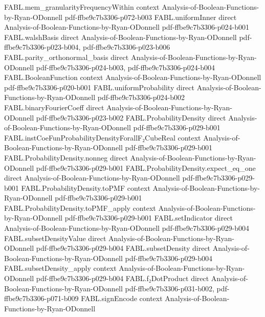 \begin{theorem}
\proofstep
  {FABL.mem_granularityFrequencyWithin}
  {context}
  {Analysis-of-Boolean-Functions-by-Ryan-ODonnell}
  {pdf-ffbe9c7b3306-p072-b003}
\proofstep
  {FABL.uniformInner}
  {direct}
  {Analysis-of-Boolean-Functions-by-Ryan-ODonnell}
  {pdf-ffbe9c7b3306-p024-b001}
\proofstep
  {FABL.walshBasis}
  {direct}
  {Analysis-of-Boolean-Functions-by-Ryan-ODonnell}
  {pdf-ffbe9c7b3306-p023-b004,
    pdf-ffbe9c7b3306-p023-b006}
\proofstep
  {FABL.parity_orthonormal_basis}
  {direct}
  {Analysis-of-Boolean-Functions-by-Ryan-ODonnell}
  {pdf-ffbe9c7b3306-p024-b003,
    pdf-ffbe9c7b3306-p024-b004}
\proofstep
  {FABL.BooleanFunction}
  {context}
  {Analysis-of-Boolean-Functions-by-Ryan-ODonnell}
  {pdf-ffbe9c7b3306-p020-b001}
\proofstep
  {FABL.uniformProbability}
  {direct}
  {Analysis-of-Boolean-Functions-by-Ryan-ODonnell}
  {pdf-ffbe9c7b3306-p024-b002}
\proofstep
  {FABL.binaryFourierCoeff}
  {direct}
  {Analysis-of-Boolean-Functions-by-Ryan-ODonnell}
  {pdf-ffbe9c7b3306-p023-b002}
\proofstep
  {FABL.ProbabilityDensity}
  {direct}
  {Analysis-of-Boolean-Functions-by-Ryan-ODonnell}
  {pdf-ffbe9c7b3306-p029-b001}
\proofstep
  {FABL.instCoeFunProbabilityDensityForallF₂CubeReal}
  {context}
  {Analysis-of-Boolean-Functions-by-Ryan-ODonnell}
  {pdf-ffbe9c7b3306-p029-b001}
\proofstep
  {FABL.ProbabilityDensity.nonneg}
  {direct}
  {Analysis-of-Boolean-Functions-by-Ryan-ODonnell}
  {pdf-ffbe9c7b3306-p029-b001}
\proofstep
  {FABL.ProbabilityDensity.expect_eq_one}
  {direct}
  {Analysis-of-Boolean-Functions-by-Ryan-ODonnell}
  {pdf-ffbe9c7b3306-p029-b001}
\proofstep
  {FABL.ProbabilityDensity.toPMF}
  {context}
  {Analysis-of-Boolean-Functions-by-Ryan-ODonnell}
  {pdf-ffbe9c7b3306-p029-b001}
\proofstep
  {FABL.ProbabilityDensity.toPMF_apply}
  {context}
  {Analysis-of-Boolean-Functions-by-Ryan-ODonnell}
  {pdf-ffbe9c7b3306-p029-b001}
\proofstep
  {FABL.setIndicator}
  {direct}
  {Analysis-of-Boolean-Functions-by-Ryan-ODonnell}
  {pdf-ffbe9c7b3306-p029-b004}
\proofstep
  {FABL.subsetDensityValue}
  {direct}
  {Analysis-of-Boolean-Functions-by-Ryan-ODonnell}
  {pdf-ffbe9c7b3306-p029-b004}
\proofstep
  {FABL.subsetDensity}
  {direct}
  {Analysis-of-Boolean-Functions-by-Ryan-ODonnell}
  {pdf-ffbe9c7b3306-p029-b004}
\proofstep
  {FABL.subsetDensity_apply}
  {context}
  {Analysis-of-Boolean-Functions-by-Ryan-ODonnell}
  {pdf-ffbe9c7b3306-p029-b004}
\proofstep
  {FABL.f₂DotProduct}
  {direct}
  {Analysis-of-Boolean-Functions-by-Ryan-ODonnell}
  {pdf-ffbe9c7b3306-p031-b002,
    pdf-ffbe9c7b3306-p071-b009}
\proofstep
  {FABL.signEncode}
  {context}
  {Analysis-of-Boolean-Functions-by-Ryan-ODonnell}

\end{theorem}
